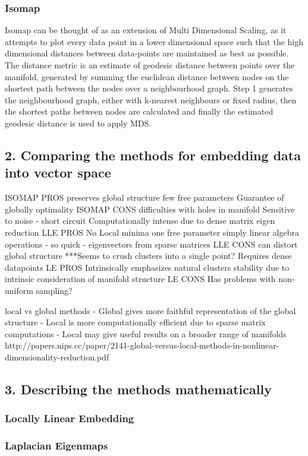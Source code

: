 \documentclass{article}
\begin{document}
\subsubsection{Isomap}
Isomap can be thought of as an extension of Multi Dimensional Scaling, as it attempts to plot every data point in a lower dimensional space such that the high dimensional distances between data-points are maintained as best as possible. The distance metric is an estimate of geodesic distance between points over the manifold, generated by summing the euclidean distance between nodes on the shortest path between the nodes over a neighbourhood graph. Step 1 generates the neighbourhood graph, either with k-nearest neighbours or fixed radius, then the shortest paths between nodes are calculated and finally the estimated geodesic distance is used to apply MDS.
\subsection{2. Comparing the methods for embedding data into vector space}
ISOMAP PROS
preserves global structure
few free parameters
Guarantee of globally optimality
ISOMAP CONS
difficulties with holes in manifold
Sensitive to noise - short circuit 
Computationally intense due to dense matrix eigen reduction 
LLE PROS
No Local minima
one free parameter
simply linear algebra operations - so quick - eigenvectors from sparse matrices 
LLE CONS
can distort global structure 
***Seems to crush clusters into a single point?
Requires dense datapoints
LE PROS
Intrinsically emphasizes natural clusters 
stability due to intrinsic consideration of manifold structure
LE CONS
Has problems with non-uniform sampling?

local vs global methods
- Global gives more faithful representation of the global structure
- Local is more computationally efficient due to sparse matrix computations 
- Local may give useful results on a broader range of manifolds
http://papers.nips.cc/paper/2141-global-versus-local-methods-in-nonlinear-dimensionality-reduction.pdf
\subsection{3. Describing the methods mathematically}
\subsubsection{Locally Linear Embedding}
\subsubsection{Laplacian Eigenmaps}
\end{document}
